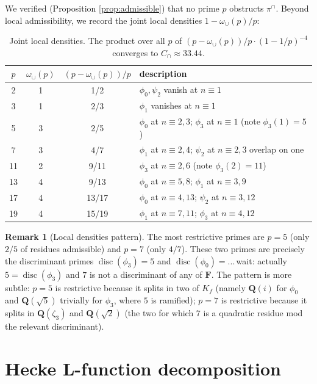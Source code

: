 \documentclass[11pt]{article}
\theoremstyle{definition}
\newtheorem{remark}[theorem]{Remark}
\newcommand{\Q}{\mathbf{Q}}
\newcommand{\F}{\mathbf{F}}
\newcommand{\F}{\mathcal{F}}
\DeclareMathOperator{\disc}{disc}
\begin{document}
We verified (Proposition \ref{prop:admissible}) that no prime $p$ obstructs $\pi^\cap$. Beyond local admissibility, we record the joint local densities $1-\omega_\cup(p)/p$:

\begin{table}[h]
\centering
\begin{tabular}{c|c|c|l}
\toprule
$p$ & $\omega_\cup(p)$ & $(p-\omega_\cup(p))/p$ & description\\
\midrule
2 & 1 & 1/2 & $\phi_0,\psi_2$ vanish at $n\equiv 1$\\
3 & 1 & 2/3 & $\phi_1$ vanishes at $n\equiv 1$\\
5 & 3 & 2/5 & $\phi_0$ at $n\equiv 2,3$; $\phi_3$ at $n\equiv 1$ (note $\phi_3(1)=5$)\\
7 & 3 & 4/7 & $\phi_1$ at $n\equiv 2,4$; $\psi_2$ at $n\equiv 2,3$ overlap on one\\
11 & 2 & 9/11 & $\phi_3$ at $n\equiv 2,6$ (note $\phi_3(2)=11$)\\
13 & 4 & 9/13 & $\phi_0$ at $n\equiv 5,8$; $\phi_1$ at $n\equiv 3,9$\\
17 & 4 & 13/17 & $\phi_0$ at $n\equiv 4,13$; $\psi_2$ at $n\equiv 3,12$\\
19 & 4 & 15/19 & $\phi_1$ at $n\equiv 7,11$; $\phi_3$ at $n\equiv 4,12$\\
\bottomrule
\end{tabular}
\caption{Joint local densities. The product over all $p$ of $(p-\omega_\cup(p))/p\cdot(1-1/p)^{-4}$ converges to $C_\cap\approx 33.44$.}\label{tab:joint-densities}
\end{table}

\begin{remark}[Local densities pattern]
The most restrictive primes are $p=5$ (only $2/5$ of residues admissible) and $p=7$ (only $4/7$). These two primes are precisely the discriminant primes $\disc(\phi_3)=5$ and $\disc(\phi_0)=...$\,wait: actually $5=\disc(\phi_3)$ and $7$ is not a discriminant of any of $\F$. The pattern is more subtle: $p=5$ is restrictive because it splits in two of $K_f$ (namely $\Q(i)$ for $\phi_0$ and $\Q(\sqrt 5)$ trivially for $\phi_3$, where $5$ is ramified); $p=7$ is restrictive because it splits in $\Q(\zeta_3)$ and $\Q(\sqrt 2)$ (the two for which $7$ is a quadratic residue mod the relevant discriminant).
\end{remark}

\section{Hecke L-function decomposition}\label{sec:hecke}
\end{document}
